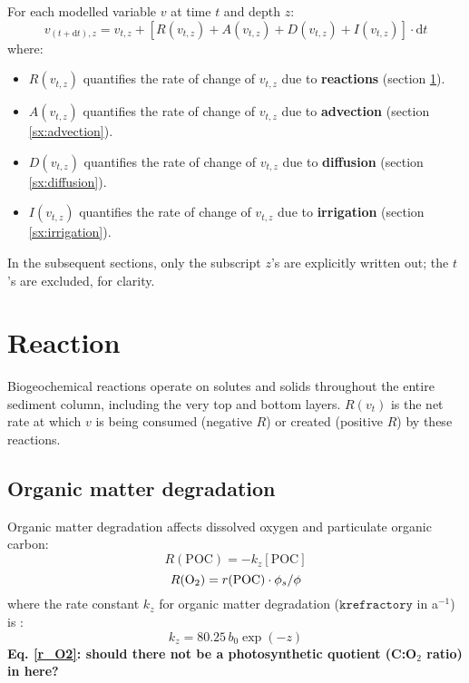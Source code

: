 \documentclass[a4paper]{article}
\newcommand{\D}[1]{\mathrm{d}#1}
\newcommand{\code}[1]{\texttt{#1}}
\newcommand{\wtf}[1]{\textcolor{Cerulean}{\textbf{#1}}}
\begin{document}
For each modelled variable $v$ at time $t$ and depth $z$:
\begin{equation}
v_{(t+\D{t}), z} = v_{t,z} + [R(v_{t,z}) + A(v_{t,z}) + D(v_{t,z}) + I(v_{t,z})] \cdot \D{t}
\end{equation}
where:
\begin{itemize}
  \item $R(v_{t,z})$ quantifies the rate of change of $v_{t,z}$ due to \textbf{reactions} (section \ref{sx:reaction}).
  \item $A(v_{t,z})$ quantifies the rate of change of $v_{t,z}$ due to \textbf{advection} (section \ref{sx:advection}).
  \item $D(v_{t,z})$ quantifies the rate of change of $v_{t,z}$ due to \textbf{diffusion} (section \ref{sx:diffusion}).
  \item $I(v_{t,z})$ quantifies the rate of change of $v_{t,z}$ due to \textbf{irrigation} (section \ref{sx:irrigation}).
\end{itemize}
In the subsequent sections, only the subscript $z$'s are explicitly written out; the $t$'s are excluded, for clarity.


\section{Reaction}\label{sx:reaction}

Biogeochemical reactions operate on solutes and solids throughout the entire sediment column, including the very top and bottom layers. $R(v_t)$ is the net rate at which $v$ is being consumed (negative $R$) or created (positive $R$) by these reactions.

\subsection{Organic matter degradation}

Organic matter degradation affects dissolved oxygen and particulate organic carbon:
\begin{equation}
R(\mathrm{POC}) = -k_z [\mathrm{POC}]
\end{equation}
\begin{equation}\label{r_O2}
R(\ce{O2}) = r(\mathrm{POC}) \cdot \phi_s / \phi
\end{equation}
where the rate constant $k_z$ for organic matter degradation ($\code{krefractory}$ in a$^{-1}$) is \citep{archer_model_2002}:
\begin{equation}\label{k_poc_degradation}
k_z = 80.25 \, b_0 \exp(-z)
\end{equation}
\wtf{Eq. \eqref{r_O2}: should there not be a photosynthetic quotient (C:O$_2$ ratio) in here?}
\end{document}
